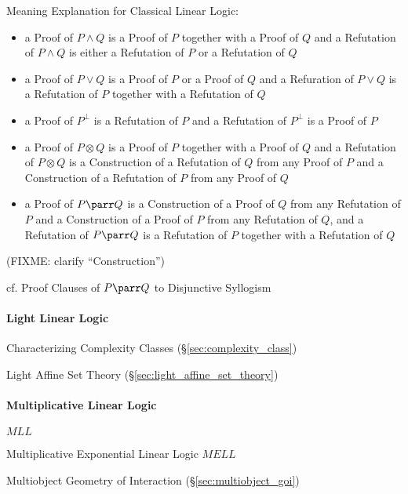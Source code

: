 Meaning Explanation for Classical Linear Logic:
\begin{itemize}
  \item a Proof of $P \wedge Q$ is a Proof of $P$ together with a Proof of $Q$
    and a Refutation of $P \wedge Q$ is either a Refutation of $P$ or a
    Refutation of $Q$
  \item a Proof of $P \vee Q$ is a Proof of $P$ or a Proof of $Q$ and a
    Refuration of $P \vee Q$ is a Refutation of $P$ together with a Refutation
    of $Q$
  \item a Proof of $P^\bot$ is a Refutation of $P$ and a Refutation of $P^\bot$
    is a Proof of $P$
  \item a Proof of $P \otimes Q$ is a Proof of $P$ together with a Proof of $Q$
    and a Refutation of $P \otimes Q$ is a Construction of a Refutation of $Q$
    from any Proof of $P$ and a Construction of a Refutation of $P$ from any
    Proof of $Q$
  \item a Proof of $P \parr Q$ is a Construction of a Proof of $Q$ from any
    Refutation of $P$ and a Construction of a Proof of $P$ from any Refutation
    of $Q$, and a Refutation of $P \parr Q$ is a Refutation of $P$ together
    with a Refutation of $Q$
\end{itemize}

(FIXME: clarify ``Construction'')

cf. Proof Clauses of $P \parr Q$ to Disjunctive Syllogism



\paragraph{Light Linear Logic}\label{sec:light_linear_logic}\hfill

Characterizing Complexity Classes (\S\ref{sec:complexity_class})

Light Affine Set Theory (\S\ref{sec:light_affine_set_theory})



\paragraph{Multiplicative Linear Logic}\hfill
\label{sec:multiplicative_linear_logic}

\cite{haghverdi-scott05}

$MLL$

Multiplicative Exponential Linear Logic $MELL$

Multiobject Geometry of Interaction (\S\ref{sec:multiobject_goi})



